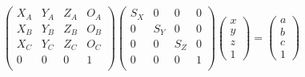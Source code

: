 \documentclass[11pt]{article}
\begin{document}
\[
\left(
\begin{array}{cccc}
X_A&Y_A&Z_A&O_A\\
X_B&Y_B&Z_B&O_B\\
X_C&Y_C&Z_C&O_C\\
0&0&0&1\\
\end{array}
\right)
\left(
\begin{array}{cccc}
S_X&0&0&0\\
0&S_Y&0&0\\
0&0&S_Z&0\\
0&0&0&1\\
\end{array}
\right)
\left(
\begin{array}{c}
x\\
y\\
z\\
1
\end{array}
\right)
=
\left(
\begin{array}{c}
a\\
b\\
c\\
1
\end{array}
\right)
\]
\end{document}
